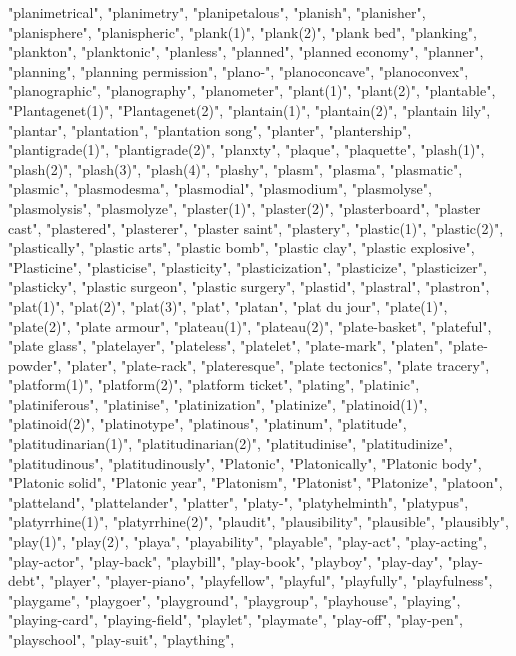 "planimetrical",
"planimetry",
"planipetalous",
"planish",
"planisher",
"planisphere",
"planispheric",
"plank(1)",
"plank(2)",
"plank bed",
"planking",
"plankton",
"planktonic",
"planless",
"planned",
"planned economy",
"planner",
"planning",
"planning permission",
"plano-",
"planoconcave",
"planoconvex",
"planographic",
"planography",
"planometer",
"plant(1)",
"plant(2)",
"plantable",
"Plantagenet(1)",
"Plantagenet(2)",
"plantain(1)",
"plantain(2)",
"plantain lily",
"plantar",
"plantation",
"plantation song",
"planter",
"plantership",
"plantigrade(1)",
"plantigrade(2)",
"planxty",
"plaque",
"plaquette",
"plash(1)",
"plash(2)",
"plash(3)",
"plash(4)",
"plashy",
"plasm",
"plasma",
"plasmatic",
"plasmic",
"plasmodesma",
"plasmodial",
"plasmodium",
"plasmolyse",
"plasmolysis",
"plasmolyze",
"plaster(1)",
"plaster(2)",
"plasterboard",
"plaster cast",
"plastered",
"plasterer",
"plaster saint",
"plastery",
"plastic(1)",
"plastic(2)",
"plastically",
"plastic arts",
"plastic bomb",
"plastic clay",
"plastic explosive",
"Plasticine",
"plasticise",
"plasticity",
"plasticization",
"plasticize",
"plasticizer",
"plasticky",
"plastic surgeon",
"plastic surgery",
"plastid",
"plastral",
"plastron",
"plat(1)",
"plat(2)",
"plat(3)",
"plat",
"platan",
"plat du jour",
"plate(1)",
"plate(2)",
"plate armour",
"plateau(1)",
"plateau(2)",
"plate-basket",
"plateful",
"plate glass",
"platelayer",
"plateless",
"platelet",
"plate-mark",
"platen",
"plate-powder",
"plater",
"plate-rack",
"plateresque",
"plate tectonics",
"plate tracery",
"platform(1)",
"platform(2)",
"platform ticket",
"plating",
"platinic",
"platiniferous",
"platinise",
"platinization",
"platinize",
"platinoid(1)",
"platinoid(2)",
"platinotype",
"platinous",
"platinum",
"platitude",
"platitudinarian(1)",
"platitudinarian(2)",
"platitudinise",
"platitudinize",
"platitudinous",
"platitudinously",
"Platonic",
"Platonically",
"Platonic body",
"Platonic solid",
"Platonic year",
"Platonism",
"Platonist",
"Platonize",
"platoon",
"platteland",
"plattelander",
"platter",
"platy-",
"platyhelminth",
"platypus",
"platyrrhine(1)",
"platyrrhine(2)",
"plaudit",
"plausibility",
"plausible",
"plausibly",
"play(1)",
"play(2)",
"playa",
"playability",
"playable",
"play-act",
"play-acting",
"play-actor",
"play-back",
"playbill",
"play-book",
"playboy",
"play-day",
"play-debt",
"player",
"player-piano",
"playfellow",
"playful",
"playfully",
"playfulness",
"playgame",
"playgoer",
"playground",
"playgroup",
"playhouse",
"playing",
"playing-card",
"playing-field",
"playlet",
"playmate",
"play-off",
"play-pen",
"playschool",
"play-suit",
"plaything",
